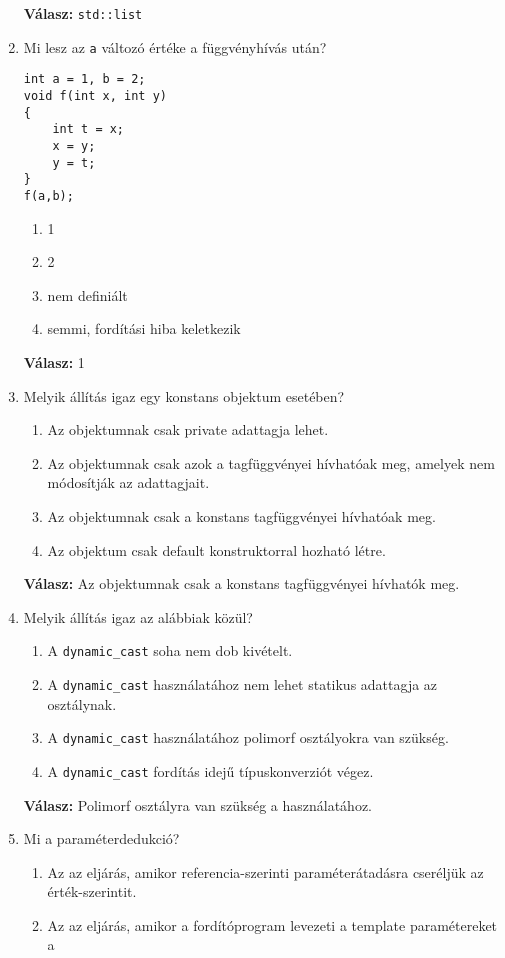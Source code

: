 \documentclass[a4paper,11.5pt,table]{article}
\begin{document}
\begin{enumerate}[1.)]
\begin{enumerate}
		\end{enumerate}
		\textbf{Válasz:} \texttt{std::list}
		\item Mi lesz az \texttt{a} változó értéke a függvényhívás után?
		\begin{lstlisting}
int a = 1, b = 2;
void f(int x, int y)
{
	int t = x;
	x = y;
	y = t;
}
f(a,b);
		\end{lstlisting}
		\begin{enumerate}
			\item 1
			\item 2
			\item nem definiált
			\item semmi, fordítási hiba keletkezik
		\end{enumerate}
		\textbf{Válasz:} 1
		\item Melyik állítás igaz egy konstans objektum esetében?
		\begin{enumerate}
			\item Az objektumnak csak private adattagja lehet.
			\item Az objektumnak csak azok a tagfüggvényei hívhatóak meg, amelyek nem
			módosítják az adattagjait.
			\item Az objektumnak csak a konstans tagfüggvényei hívhatóak meg.
			\item Az objektum csak default konstruktorral hozható létre.
		\end{enumerate}
		\textbf{Válasz:} Az objektumnak csak a konstans tagfüggvényei hívhatók meg.
		\item Melyik állítás igaz az alábbiak közül?
		\begin{enumerate}
			\item A \texttt{dynamic\_cast} soha nem dob kivételt.
			\item A \texttt{dynamic\_cast} használatához nem lehet statikus adattagja az osztálynak.
			\item A \texttt{dynamic\_cast} használatához polimorf osztályokra van szükség.
			\item A \texttt{dynamic\_cast} fordítás idejű típuskonverziót végez.
		\end{enumerate}
		\textbf{Válasz:} Polimorf osztályra van szükség a használatához.
		\item Mi a paraméterdedukció?
		\begin{enumerate}
			\item Az az eljárás, amikor referencia-szerinti paraméterátadásra cseréljük az
			érték-szerintit.
			\item Az az eljárás, amikor a fordítóprogram levezeti a template paramétereket a

\end{enumerate}
\end{enumerate}
\end{document}

